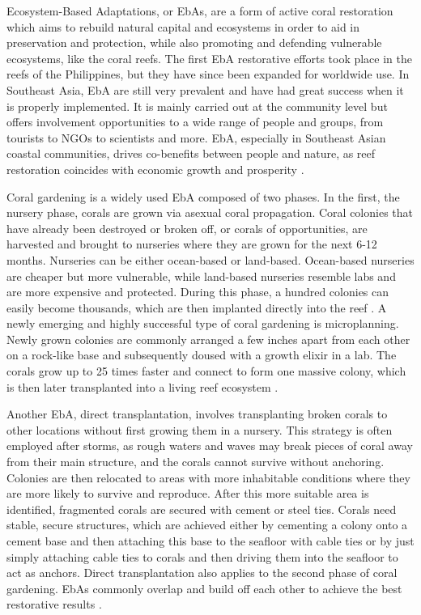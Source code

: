 \documentclass{book}\usepackage{knitr}
\begin{document}
\begin{knitrout}
\begin{kframe}
Ecosystem-Based Adaptations, or EbAs, are a form of active coral restoration which aims to rebuild natural capital and ecosystems in order to aid in preservation and protection, while also promoting and defending vulnerable ecosystems, like the coral reefs. The first EbA restorative efforts took place in the reefs of the Philippines, but they have since been expanded for worldwide use. In Southeast Asia, EbA are still very prevalent and have had great success when it is properly implemented. It is mainly carried out at the community level but offers involvement opportunities to a wide range of people and groups, from tourists to NGOs to scientists and more. EbA, especially in Southeast Asian coastal communities, drives co-benefits between people and nature, as reef restoration coincides with economic growth and prosperity \citep{14551496520201201}.

Coral gardening is a widely used EbA composed of two phases. In the first, the nursery phase, corals are grown via asexual coral propagation. Coral colonies that have already been destroyed or broken off, or corals of opportunities, are harvested and brought to nurseries where they are grown for the next 6-12 months. Nurseries can be either ocean-based or land-based. Ocean-based nurseries are cheaper but more vulnerable, while land-based nurseries resemble labs and are more expensive and protected.  During this phase, a hundred colonies can easily become thousands, which are then implanted directly into the reef \citep{cgarden}. A newly emerging and highly successful type of coral gardening is microplanning. Newly grown colonies are commonly arranged a few inches apart from each other on a rock-like base and subsequently doused with a growth elixir in a lab. The corals grow up to 25 times faster and connect to form one massive colony, which is then later transplanted into a living reef ecosystem \citep{Morin_2014}.

Another EbA, direct transplantation, involves transplanting broken corals to other locations without first growing them in a nursery. This strategy is often employed after storms, as rough waters and waves may break pieces of coral away from their main structure, and the corals cannot survive without anchoring. Colonies are then relocated to areas with more inhabitable conditions where they are more likely to survive and reproduce. After this more suitable area is identified, fragmented corals are secured with cement or steel ties. Corals need stable, secure structures, which are achieved either by cementing a colony onto a cement base and then attaching this base to the seafloor with cable ties or by just simply attaching cable ties to corals and then driving them into the seafloor to act as anchors. Direct transplantation also applies to the second phase of coral gardening. EbAs commonly overlap and build off each other to achieve the best restorative results \citep{areef}.


\end{kframe}
\end{knitrout}
\end{document}
